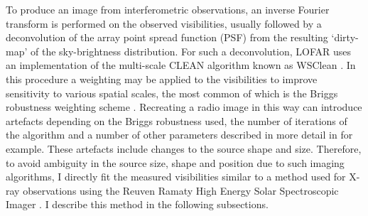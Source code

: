 To produce an image from interferometric observations, an inverse Fourier transform is performed on the observed visibilities, usually followed by a deconvolution of the array point spread function (PSF) from the resulting `dirty-map' of the sky-brightness distribution.
For such a deconvolution, LOFAR uses an implementation of the multi-scale CLEAN algorithm known as WSClean \citep{Offringa2014}. In this procedure a weighting may be applied to the visibilities to improve sensitivity to various spatial scales, the most common of which is the Briggs robustness weighting scheme \citep{Briggs1995}. Recreating a radio image in this way can introduce artefacts depending on the Briggs robustness used, the number of iterations of the algorithm and a number of other parameters described in more detail in \cite{Hogbom1974, Cornwell2008, Offringa2014, Offringa2017} for example. These artefacts include changes to the source shape and size. Therefore, to avoid ambiguity in the source size, shape and position due to such imaging algorithms, I directly fit the measured visibilities similar to a method used for X-ray observations using the Reuven Ramaty High Energy Solar Spectroscopic Imager \citep[RHESSI][]{Hurford2002, Kontar2010}. I describe this method in the following subsections. 

